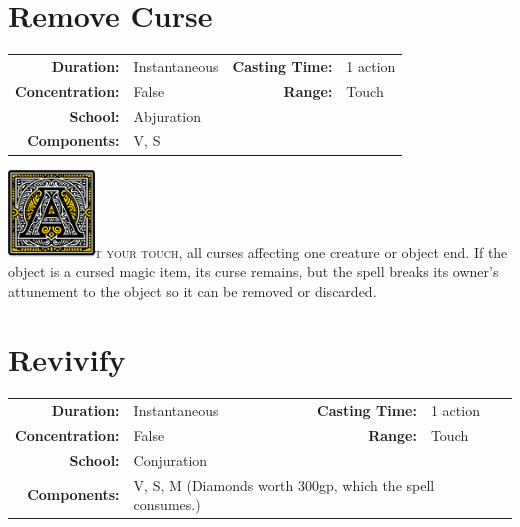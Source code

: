 \documentclass[12pt,showtrims]{memoir}
\begin{document}
\newpage
\section*{Remove Curse}

{
\small\centering\vspace{-6pt}
\begin{tabular}{rlrl}
\toprule

\textbf{Duration:} & Instantaneous &
\textbf{Casting Time:} & 1 action \\
\textbf{Concentration:} & False &
\textbf{Range:} & Touch \\
\textbf{School:} & Abjuration \\
\textbf{Components:} & \multicolumn{3}{p{0.7\textwidth}}{V, S}\\

\bottomrule
\end{tabular}
}

\vspace{1\baselineskip}\noindent
\lettrine[lines=4]{\includegraphics[height=66pt]{initials/A.png}}{t your touch}, all curses affecting one creature or object end. If the object is a cursed magic item, its curse remains, but the spell breaks its owner's attunement to the object so it can be removed or discarded.

\newpage
\section*{Revivify}

{
\small\centering\vspace{-6pt}
\begin{tabular}{rlrl}
\toprule

\textbf{Duration:} & Instantaneous &
\textbf{Casting Time:} & 1 action \\
\textbf{Concentration:} & False &
\textbf{Range:} & Touch \\
\textbf{School:} & Conjuration \\
\textbf{Components:} & \multicolumn{3}{p{0.7\textwidth}}{V, S, M (Diamonds worth 300gp, which the spell consumes.)}\\

\bottomrule
\end{tabular}
}
\end{document}
